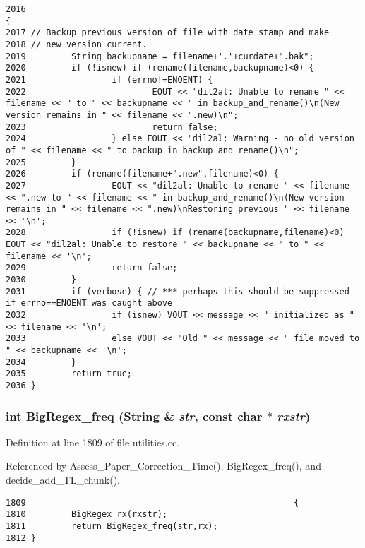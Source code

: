 \footnotesize\begin{verbatim}2016                                                                             {
2017 // Backup previous version of file with date stamp and make
2018 // new version current.
2019         String backupname = filename+'.'+curdate+".bak";
2020         if (!isnew) if (rename(filename,backupname)<0) {
2021                 if (errno!=ENOENT) {
2022                         EOUT << "dil2al: Unable to rename " << filename << " to " << backupname << " in backup_and_rename()\n(New version remains in " << filename << ".new)\n";
2023                         return false;
2024                 } else EOUT << "dil2al: Warning - no old version of " << filename << " to backup in backup_and_rename()\n";
2025         }
2026         if (rename(filename+".new",filename)<0) {
2027                 EOUT << "dil2al: Unable to rename " << filename << ".new to " << filename << " in backup_and_rename()\n(New version remains in " << filename << ".new)\nRestoring previous " << filename << '\n';
2028                 if (!isnew) if (rename(backupname,filename)<0) EOUT << "dil2al: Unable to restore " << backupname << " to " << filename << '\n';
2029                 return false;
2030         }
2031         if (verbose) { // *** perhaps this should be suppressed if errno==ENOENT was caught above
2032                 if (isnew) VOUT << message << " initialized as " << filename << '\n';
2033                 else VOUT << "Old " << message << " file moved to " << backupname << '\n';
2034         }
2035         return true;
2036 }
\end{verbatim}\normalsize 
{}
\subsubsection{\setlength{\rightskip}{0pt plus 5cm}int Big\-Regex\_\-freq ({\bf String} \& {\em str}, const char $\ast$ {\em rxstr})}\label{utilities_8cc_a17}




Definition at line 1809 of file utilities.cc.

Referenced by Assess\_\-Paper\_\-Correction\_\-Time(), Big\-Regex\_\-freq(), and decide\_\-add\_\-TL\_\-chunk().



\footnotesize\begin{verbatim}1809                                                     {
1810         BigRegex rx(rxstr);
1811         return BigRegex_freq(str,rx);
1812 }
\end{verbatim}\normalsize 
{}
